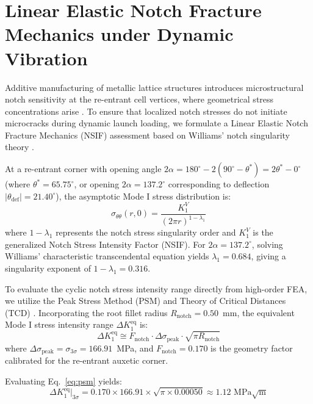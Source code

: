 \documentclass[preprint,12pt,3p]{elsarticle}
\begin{document}
\section{Linear Elastic Notch Fracture Mechanics under Dynamic Vibration}
\label{sec:fracture}

Additive manufacturing of metallic lattice structures introduces microstructural notch sensitivity at the re-entrant cell vertices, where geometrical stress concentrations arise \cite{collini2024}. To ensure that localized notch stresses do not initiate microcracks during dynamic launch loading, we formulate a Linear Elastic Notch Fracture Mechanics (NSIF) assessment based on Williams' notch singularity theory \cite{williams1952}.

At a re-entrant corner with opening angle $2\alpha = 180^\circ - 2(90^\circ - \theta^*) = 2\theta^* - 0^\circ$ (where $\theta^* = 65.75^\circ$, or opening $2\alpha = 137.2^\circ$ corresponding to deflection $|\theta_{\text{def}}| = 21.40^\circ$), the asymptotic Mode I stress distribution is:
\begin{equation}
  \sigma_{\theta\theta}(r, 0) = \frac{K_1^V}{(2\pi r)^{1 - \lambda_1}}
  \label{eq:williams}
\end{equation}
where $1 - \lambda_1$ represents the notch stress singularity order and $K_1^V$ is the generalized Notch Stress Intensity Factor (NSIF). For $2\alpha = 137.2^\circ$, solving Williams' characteristic transcendental equation yields $\lambda_1 = 0.684$, giving a singularity exponent of $1 - \lambda_1 = 0.316$.

To evaluate the cyclic notch stress intensity range directly from high-order FEA, we utilize the Peak Stress Method (PSM) and Theory of Critical Distances (TCD) \cite{collini2024}. Incorporating the root fillet radius $R_{\text{notch}} = 0.50$~mm, the equivalent Mode I stress intensity range $\Delta K_1^{\text{eq}}$ is:
\begin{equation}
  \Delta K_1^{\text{eq}} \cong F_{\text{notch}} \cdot \Delta \sigma_{\text{peak}} \cdot \sqrt{\pi R_{\text{notch}}}
  \label{eq:psm}
\end{equation}
where $\Delta \sigma_{\text{peak}} = \sigma_{3\sigma} = 166.91$~MPa, and $F_{\text{notch}} = 0.170$ is the geometry factor calibrated for the re-entrant auxetic corner.

Evaluating Eq.~\eqref{eq:psm} yields:
\begin{equation}
  \Delta K_1^{\text{eq}}\big|_{3\sigma} = 0.170 \times 166.91 \times \sqrt{\pi \times 0.00050} \approx 1.12\text{ MPa}\sqrt{\text{m}}
\end{equation}
\end{document}

